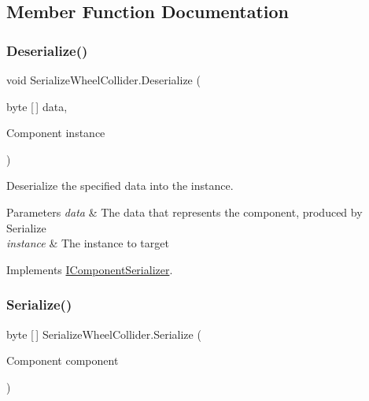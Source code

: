 \subsection{Member Function Documentation}
\mbox{\label{class_serialize_wheel_collider_aa0fb4372a07823644b82f0fc968b4fcf}} 
\subsubsection{\texorpdfstring{Deserialize()}{Deserialize()}}
{\footnotesize\ttfamily void Serialize\+Wheel\+Collider.\+Deserialize (\begin{DoxyParamCaption}\item[{byte \mbox{[}$\,$\mbox{]}}]{data,  }\item[{Component}]{instance }\end{DoxyParamCaption})\hspace{0.3cm}{\ttfamily [inline]}}



Deserialize the specified data into the instance. 


\begin{DoxyParams}{Parameters}
{\em data} & The data that represents the component, produced by Serialize \\
\hline
{\em instance} & The instance to target \\
\hline
\end{DoxyParams}


Implements \hyperlink{interface_i_component_serializer_a4cc366a5c78b33d47a90c209d8fed883}{I\+Component\+Serializer}.

\mbox{\label{class_serialize_wheel_collider_aeecc61865e7331afb0436aae4f53dc4d}} 
\subsubsection{\texorpdfstring{Serialize()}{Serialize()}}
{\footnotesize\ttfamily byte \mbox{[}$\,$\mbox{]} Serialize\+Wheel\+Collider.\+Serialize (\begin{DoxyParamCaption}\item[{Component}]{component }\end{DoxyParamCaption})\hspace{0.3cm}{\ttfamily [inline]}}




